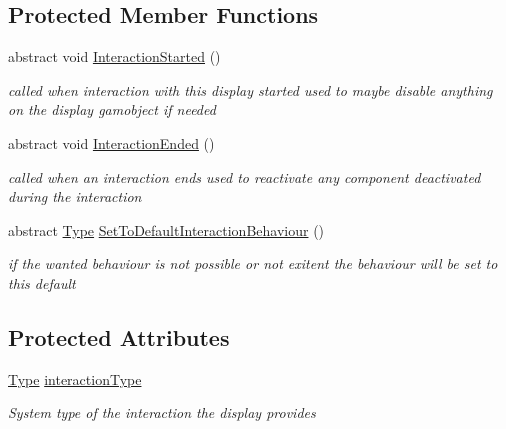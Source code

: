 \subsection*{Protected Member Functions}
\begin{DoxyCompactItemize}
\item 
abstract void \mbox{\hyperlink{class_display_a21c51fcf185403197a78a5acfd2065de}{Interaction\+Started}} ()
\begin{DoxyCompactList}\small\item\em called when interaction with this display started used to maybe disable anything on the display gamobject if needed \end{DoxyCompactList}\item 
abstract void \mbox{\hyperlink{class_display_a6fd38485267e1b78f1d1dfb589ec4ae0}{Interaction\+Ended}} ()
\begin{DoxyCompactList}\small\item\em called when an interaction ends used to reactivate any component deactivated during the interaction \end{DoxyCompactList}\item 
abstract \mbox{\hyperlink{class_display_a2c80ba13fff1fd81aaa6915b28e8c14f}{Type}} \mbox{\hyperlink{class_display_a81f07350cf50b3924f4fe269e1b4cf17}{Set\+To\+Default\+Interaction\+Behaviour}} ()
\begin{DoxyCompactList}\small\item\em if the wanted behaviour is not possible or not exitent the behaviour will be set to this default \end{DoxyCompactList}\end{DoxyCompactItemize}
\subsection*{Protected Attributes}
\begin{DoxyCompactItemize}
\item 
\mbox{\hyperlink{class_display_a2c80ba13fff1fd81aaa6915b28e8c14f}{Type}} \mbox{\hyperlink{class_display_aab913d6cfa4e9631e8129ed131e79196}{interaction\+Type}}
\begin{DoxyCompactList}\small\item\em System type of the interaction the display provides \end{DoxyCompactList}\end{DoxyCompactItemize}
